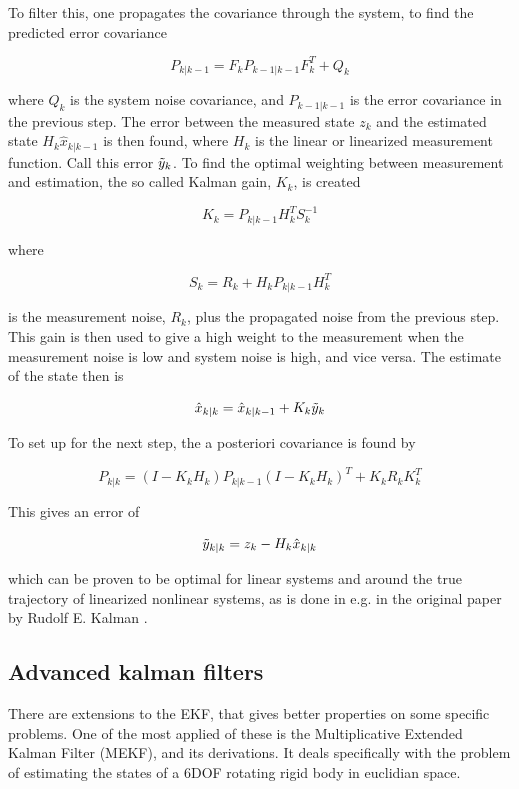 To filter this, one propagates the covariance through the system, to find the predicted error covariance

\begin{equation}
    P_{k|k-1} = F_k P_{k-1|k-1} F^T_{k} + Q_k
\end{equation}

where $Q_k$ is the system noise covariance, and $P_{k-1|k-1}$ is the error covariance in the previous step. The error between the measured state $z_k$ and the estimated state $H_k \hat{x}_{k|k-1}$ is then found, where $H_k$ is the linear or linearized measurement function. Call this error $\Tilde{y}_k$. To find the optimal weighting between measurement and estimation, the so called Kalman gain, $K_k$, is created

\begin{equation}
    K_k = P_{k|k-1}H^T_kS^{-1}_k
\end{equation}

where 

\begin{equation}
    S_k = R_k + H_kP_{k|k-1}H^T_k
\end{equation}

is the measurement noise, $R_k$, plus the propagated noise from the previous step. This gain is then used to give a high weight to the measurement when the measurement noise is low and system noise is high, and vice versa. The estimate of the state then is

\begin{equation}
    \hat{x}_{k|k} = \hat{x}_{k|k-1} + K_k\Tilde{y}_k
\end{equation}

To set up for the next step, the a posteriori covariance is found by

\begin{equation}
    P_{k|k} = (I-K_kH_k)P_{k|k-1}(I-K_kH_k)^T + K_kR_kK^T_k
\end{equation}

This gives an error of 

\begin{equation}
    \Tilde{y}_{k|k} = z_k - H_k\hat{x}_{k|k}
\end{equation}

which can be proven to be optimal for linear systems and around the true trajectory of linearized nonlinear systems, as is done in e.g. in the original paper by Rudolf E. Kalman \cite{kalmanOG}.

\subsection{Advanced kalman filters}
There are extensions to the EKF, that gives better properties on some specific problems. One of the most applied of these is the Multiplicative Extended Kalman Filter (MEKF)\cite{MEKF}, and its derivations. It deals specifically with the problem of estimating the states of a 6DOF rotating rigid body in euclidian space. 

